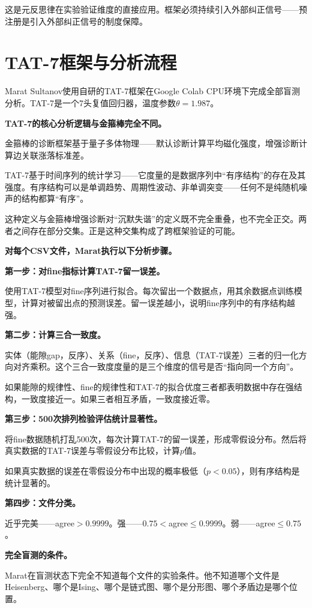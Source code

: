 \documentclass[11pt,a4paper]{book}
\theoremstyle{definition}
\begin{document}
这是元反思律在实验验证维度的直接应用。框架必须持续引入外部纠正信号——预注册是引入外部纠正信号的制度保障。

\section{TAT-7框架与分析流程}

Marat Sultanov使用自研的TAT-7框架在Google Colab CPU环境下完成全部盲测分析。TAT-7是一个7头复值回归器，温度参数$\theta=1.987$。

\textbf{TAT-7的核心分析逻辑与金箍棒完全不同。}

金箍棒的诊断框架基于量子多体物理——默认诊断计算平均磁化强度，增强诊断计算边关联涨落标准差。

TAT-7基于时间序列的统计学习——它度量的是数据序列中“有序结构”的存在及其强度。有序结构可以是单调趋势、周期性波动、非单调突变——任何不是纯随机噪声的结构都算“有序”。

这种定义与金箍棒增强诊断对“沉默失谐”的定义既不完全重叠，也不完全正交。两者之间存在部分交集。正是这种交集构成了跨框架验证的可能。

\textbf{对每个CSV文件，Marat执行以下分析步骤。}

\textbf{第一步：对fine指标计算TAT-7留一误差。}

使用TAT-7模型对fine序列进行拟合。每次留出一个数据点，用其余数据点训练模型，计算对被留出点的预测误差。留一误差越小，说明fine序列中的有序结构越强。

\textbf{第二步：计算三合一致度。}

实体（能隙gap，反序）、关系（fine，反序）、信息（TAT-7误差）三者的归一化方向对齐乘积。这个三合一致度度量的是三个维度的信号是否“指向同一个方向”。

如果能隙的规律性、fine的规律性和TAT-7的拟合优度三者都表明数据中存在强结构，一致度接近一。如果三者相互矛盾，一致度接近零。

\textbf{第三步：500次排列检验评估统计显著性。}

将fine数据随机打乱500次，每次计算TAT-7的留一误差，形成零假设分布。然后将真实数据的TAT-7误差与零假设分布比较，计算$p$值。

如果真实数据的误差在零假设分布中出现的概率极低（$p<0.05$），则有序结构是统计显著的。

\textbf{第四步：文件分类。}

近乎完美——agree$>0.9999$。强——$0.75<$agree$\le0.9999$。弱——agree$\le0.75$。

\textbf{完全盲测的条件。}

Marat在盲测状态下完全不知道每个文件的实验条件。他不知道哪个文件是Heisenberg、哪个是Ising、哪个是链式图、哪个是分形图、哪个矛盾边是哪个位置。
\end{document}

